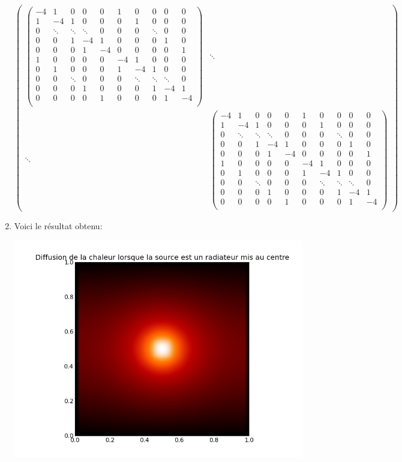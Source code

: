 \documentclass{article}
\begin{document}
\begin{enumerate}
    \[\left(\begin{array}{cccc}
    \left(\begin{array}{ccccc|ccccc}
    -4&1&0&0&0&1&0&0&0&0\\
    1&-4&1&0&0&0&1&0&0&0\\
    0&\ddots&\ddots&\ddots&0&0&0&\ddots&0&0\\
    0&0&1&-4&1&0&0&0&1&0\\
    0&0&0&1&-4&0&0&0&0&1\\
    \hline
    1&0&0&0&0&-4&1&0&0&0\\
    0&1&0&0&0&1&-4&1&0&0\\
    0&0&\ddots&0&0&0&\ddots&\ddots&\ddots&0\\
    0&0&0&1&0&0&0&1&-4&1\\
    0&0&0&0&1&0&0&0&1&-4\\
    \end{array}\right)&\ddots\\
    
    \ddots&\left(\begin{array}{ccccc|ccccc}
    -4&1&0&0&0&1&0&0&0&0\\
    1&-4&1&0&0&0&1&0&0&0\\
    0&\ddots&\ddots&\ddots&0&0&0&\ddots&0&0\\
    0&0&1&-4&1&0&0&0&1&0\\
    0&0&0&1&-4&0&0&0&0&1\\
    \hline
    1&0&0&0&0&-4&1&0&0&0\\
    0&1&0&0&0&1&-4&1&0&0\\
    0&0&\ddots&0&0&0&\ddots&\ddots&\ddots&0\\
    0&0&0&1&0&0&0&1&-4&1\\
    0&0&0&0&1&0&0&0&1&-4\\
    \end{array}\right)\end{array}\right)\]
    

\item Voici le résultat obtenu:

\begin{center}
\includegraphics[scale=0.5]{center.png}
\end{center}


\end{enumerate}
\end{document}
